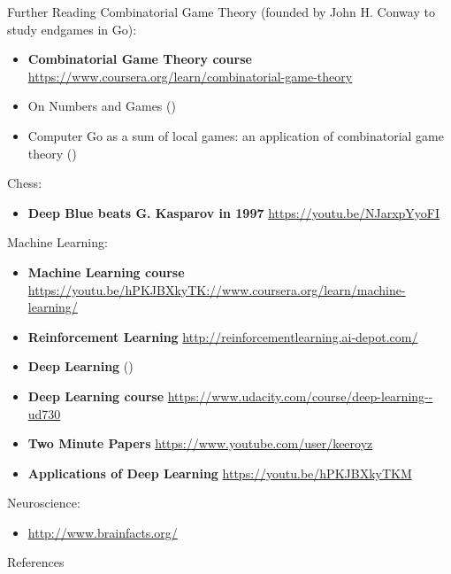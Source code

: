 \documentclass{beamer}
\begin{document}
\begin{frame}[allowframebreaks]{Further Reading}
    Combinatorial Game Theory (founded by John H. Conway to study endgames in Go):
    \begin{itemize}
      \item \textbf{Combinatorial Game Theory course} \url{https://www.coursera.org/learn/combinatorial-game-theory}
      \item On Numbers and Games (\cite{Conway1976number})
      \item Computer Go as a sum of local games: an application of combinatorial game theory (\cite{Muller1995computer})
    \end{itemize}

    Chess:
    \begin{itemize}
      \item \textbf{Deep Blue beats G. Kasparov in 1997} \url{https://youtu.be/NJarxpYyoFI}
    \end{itemize}

    Machine Learning:
    \begin{itemize}
      \item \textbf{Machine Learning course} \url{https://youtu.be/hPKJBXkyTK://www.coursera.org/learn/machine-learning/}
      \item \textbf{Reinforcement Learning} \url{http://reinforcementlearning.ai-depot.com/}
      \item \textbf{Deep Learning} (\cite{Lecun2015deep})
      \item \textbf{Deep Learning course} \url{https://www.udacity.com/course/deep-learning--ud730}
      \item \textbf{Two Minute Papers} \url{https://www.youtube.com/user/keeroyz}
      \item \textbf{Applications of Deep Learning} \url{https://youtu.be/hPKJBXkyTKM}
    \end{itemize}

    Neuroscience:
    \begin{itemize}
      \item \url{http://www.brainfacts.org/}
    \end{itemize}
  \end{frame}

  \begin{frame}[allowframebreaks]{References}
    \tiny
    \printbibliography[heading=none]
  \end{frame}
\end{document}
